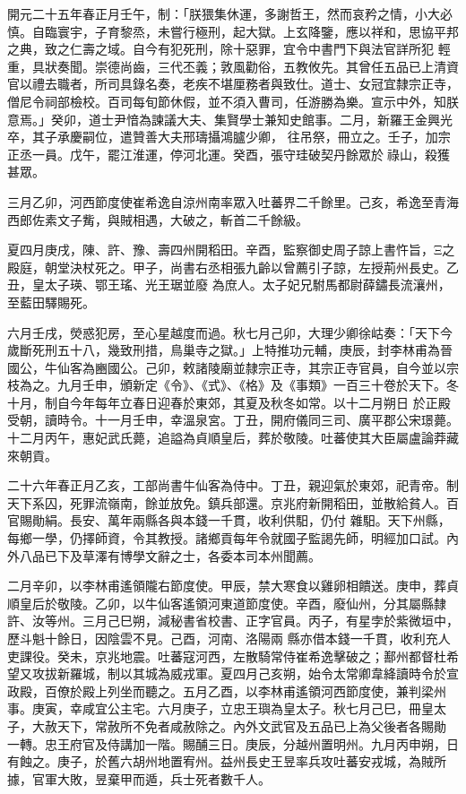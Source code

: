 
\begin{pinyinscope}

 開元二十五年春正月壬午，制：「朕猥集休運，多謝哲王，然而哀矜之情，小大必慎。自臨寰宇，子育黎烝，未嘗行極刑，起大獄。上玄降鑒，應以祥和，思協平邦之典，致之仁壽之域。自今有犯死刑，除十惡罪，宜令中書門下與法官詳所犯
 輕重，具狀奏聞。崇德尚齒，三代丕義；敦風勸俗，五教攸先。其曾任五品已上清資官以禮去職者，所司具錄名奏，老疾不堪厘務者與致仕。道士、女冠宜隸宗正寺，僧尼令祠部檢校。百司每旬節休假，並不須入曹司，任游勝為樂。宣示中外，知朕意焉。」癸卯，道士尹愔為諫議大夫、集賢學士兼知史館事。二月，新羅王金興光卒，其子承慶嗣位，遣贊善大夫邢璹攝鴻臚少卿，
 往吊祭，冊立之。壬子，加宗正丞一員。戊午，罷江淮運，停河北運。癸酉，張守珪破契丹餘眾於祿山，殺獲甚眾。



 三月乙卯，河西節度使崔希逸自涼州南率眾入吐蕃界二千餘里。己亥，希逸至青海西郎佐素文子觜，與賊相遇，大破之，斬首二千餘級。



 夏四月庚戌，陳、許、豫、壽四州開稻田。辛酉，監察御史周子諒上書忤旨，Ξ之殿庭，朝堂決杖死之。甲子，尚書右丞相張九齡以曾薦引子諒，左授荊州長史。乙丑，皇太子瑛、鄂王瑤、光王琚並廢
 為庶人。太子妃兄駙馬都尉薛鏽長流瀼州，至藍田驛賜死。



 六月壬戌，熒惑犯房，至心星越度而過。秋七月己卯，大理少卿徐岵奏：「天下今歲斷死刑五十八，幾致刑措，鳥巢寺之獄。」上特推功元輔，庚辰，封李林甫為晉國公，牛仙客為豳國公。己卯，敕諸陵廟並隸宗正寺，其宗正寺官員，自今並以宗枝為之。九月壬申，頒新定《令》、《式》、《格》及《事類》一百三十卷於天下。冬十月，制自今年每年立春日迎春於東郊，其夏及秋冬如常。以十二月朔日
 於正殿受朝，讀時令。十一月壬申，幸溫泉宮。丁丑，開府儀同三司、廣平郡公宋璟薨。十二月丙午，惠妃武氏薨，追謚為貞順皇后，葬於敬陵。吐蕃使其大臣屬盧論莽藏來朝貢。



 二十六年春正月乙亥，工部尚書牛仙客為侍中。丁丑，親迎氣於東郊，祀青帝。制天下系囚，死罪流嶺南，餘並放免。鎮兵部還。京兆府新開稻田，並散給貧人。百官賜勛絹。長安、萬年兩縣各與本錢一千貫，收利供馹，仍付
 雜馹。天下州縣，每鄉一學，仍擇師資，令其教授。諸鄉貢每年令就國子監謁先師，明經加口試。內外八品已下及草澤有博學文辭之士，各委本司本州聞薦。



 二月辛卯，以李林甫遙領隴右節度使。甲辰，禁大寒食以雞卵相饋送。庚申，葬貞順皇后於敬陵。乙卯，以牛仙客遙領河東道節度使。辛酉，廢仙州，分其屬縣隸許、汝等州。三月己巳朔，減秘書省校書、正字官員。丙子，有星孛於紫微垣中，歷斗魁十餘日，因陰雲不見。己酉，河南、洛陽兩
 縣亦借本錢一千貫，收利充人吏課役。癸未，京兆地震。吐蕃寇河西，左散騎常侍崔希逸擊破之；鄯州都督杜希望又攻拔新羅城，制以其城為威戎軍。夏四月己亥朔，始令太常卿韋絳讀時令於宣政殿，百僚於殿上列坐而聽之。五月乙酉，以李林甫遙領河西節度使，兼判梁州事。庚寅，幸咸宜公主宅。六月庚子，立忠王璵為皇太子。秋七月己巳，冊皇太子，大赦天下，常赦所不免者咸赦除之。內外文武官及五品已上為父後者各賜勛
 一轉。忠王府官及侍講加一階。賜酺三日。庚辰，分越州置明州。九月丙申朔，日有蝕之。庚子，於舊六胡州地置宥州。益州長史王昱率兵攻吐蕃安戎城，為賊所據，官軍大敗，昱棄甲而遁，兵士死者數千人。




\end{pinyinscope}
